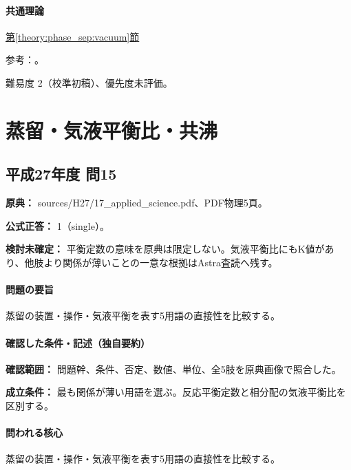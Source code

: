 \paragraph{共通理論} \hyperref[theory:phase_sep:vacuum]{第\ref*{theory:phase_sep:vacuum}節}

\par 参考：\cite{leybold_cryopump}。

\par 難易度 2（校準初稿）、優先度未評価。

\section{蒸留・気液平衡比・共沸}

\subsection{平成27年度 問15}
\label{q:h27-reg-applied-15}

\noindent\textbf{原典：} sources/H27/17\_applied\_science.pdf、PDF物理5頁。

\textbf{公式正答：} 1（single）。

\par\textbf{検討未確定：} 平衡定数の意味を原典は限定しない。気液平衡比にもK値があり、他肢より関係が薄いことの一意な根拠はAstra査読へ残す。

\paragraph{問題の要旨} 蒸留の装置・操作・気液平衡を表す5用語の直接性を比較する。

\paragraph{確認した条件・記述（独自要約）}\mbox{}\par

\noindent\textbf{確認範囲：} 問題幹、条件、否定、数値、単位、全5肢を原典画像で照合した。\par

\noindent\textbf{成立条件：} 最も関係が薄い用語を選ぶ。反応平衡定数と相分配の気液平衡比を区別する。\par

\paragraph{問われる核心} 蒸留の装置・操作・気液平衡を表す5用語の直接性を比較する。

